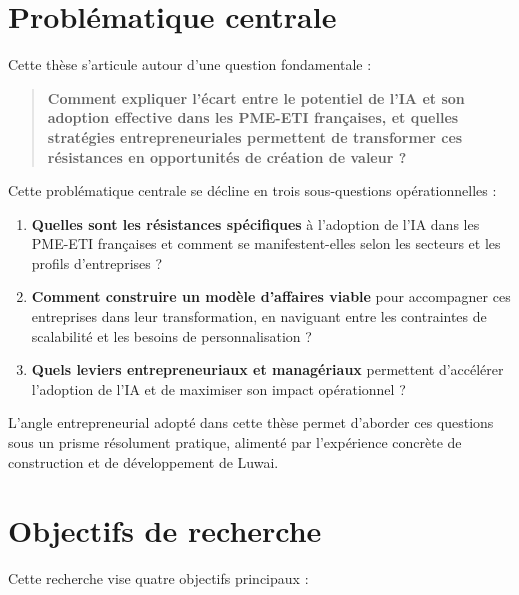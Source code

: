 \section{Problématique centrale}

Cette thèse s'articule autour d'une question fondamentale :

\begin{quote}
\textbf{Comment expliquer l'écart entre le potentiel de l'IA et son adoption effective dans les PME-ETI françaises, et quelles stratégies entrepreneuriales permettent de transformer ces résistances en opportunités de création de valeur ?}
\end{quote}

Cette problématique centrale se décline en trois sous-questions opérationnelles :

\begin{enumerate}
    \item \textbf{Quelles sont les résistances spécifiques} à l'adoption de l'IA dans les PME-ETI françaises et comment se manifestent-elles selon les secteurs et les profils d'entreprises ?
    \item \textbf{Comment construire un modèle d'affaires viable} pour accompagner ces entreprises dans leur transformation, en naviguant entre les contraintes de scalabilité et les besoins de personnalisation ?
    \item \textbf{Quels leviers entrepreneuriaux et managériaux} permettent d'accélérer l'adoption de l'IA et de maximiser son impact opérationnel ?
\end{enumerate}
\medskip
L'angle entrepreneurial adopté dans cette thèse permet d'aborder ces questions sous un prisme résolument pratique, alimenté par l'expérience concrète de construction et de développement de Luwai.

\section{Objectifs de recherche}

Cette recherche vise quatre objectifs principaux :

